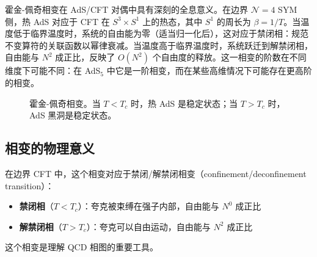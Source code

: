 \begin{note}[霍金-佩奇相变的全息意义]
霍金-佩奇相变在 AdS/CFT 对偶中具有深刻的全息意义。在边界 $\mathcal{N}=4$ SYM 侧，热 AdS 对应于 CFT 在 $S^3 \times S^1$ 上的热态，其中 $S^1$ 的周长为 $\beta = 1/T$。当温度低于临界温度时，系统的自由能为零（适当归一化后），这对应于禁闭相：规范不变算符的关联函数以幂律衰减。当温度高于临界温度时，系统跃迁到解禁闭相，自由能与 $N^2$ 成正比，反映了 $O(N^2)$ 个自由度的释放。这一相变的阶数在不同维度下可能不同：在 AdS$_5$ 中它是一阶相变，而在某些高维情况下可能存在更高阶的相变\cite{Witten1998b}。
\end{note}

\begin{figure}[htbp]
\centering
{}
\caption{霍金-佩奇相变。当 $T < T_c$ 时，热 AdS 是稳定状态；当 $T > T_c$ 时，AdS 黑洞是稳定状态。}
\label{fig:hawking_page}
\end{figure}

\subsection{相变的物理意义}

\begin{note}[霍金-佩奇相变的物理意义]
在边界 CFT 中，这个相变对应于禁闭/解禁闭相变（confinement/deconfinement transition）：
\begin{itemize}
    \item \textbf{禁闭相}（$T < T_c$）：夸克被束缚在强子内部，自由能与 $N^0$ 成正比
    \item \textbf{解禁闭相}（$T > T_c$）：夸克可以自由运动，自由能与 $N^2$ 成正比
\end{itemize}
这个相变是理解 QCD 相图的重要工具。
\end{note}

